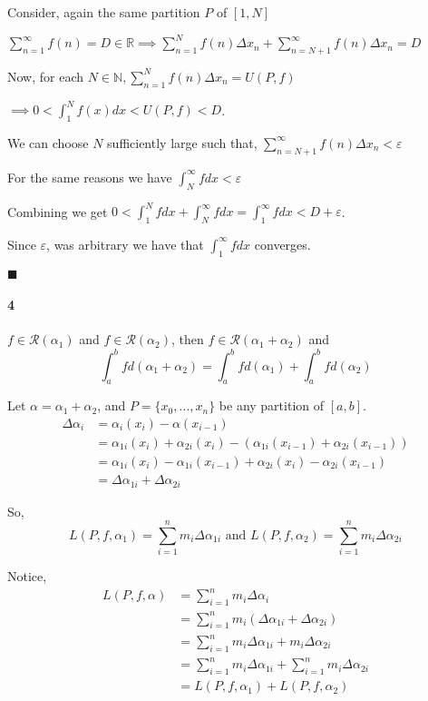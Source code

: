 \documentclass{article}
\newcommand\N{\mathbb{N}}
\newcommand\R{\mathbb{R}}
\begin{document}
Consider, again the same partition $P$ of $[1,N]$

$\sum_{n = 1}^\infty f(n) = D \in \R \implies \sum_{n=1}^{N}
f(n)\varDelta x_n + \sum_{n=N+1}^\infty f(n)\varDelta x_n = D$

Now, for each $N \in \N, \sum_{n=1}^N f(n)\varDelta x_n = U(P,f)$

$\implies 0 < \int_1^Nf(x) dx < U(P,f) < D$.

We can choose $N$ sufficiently large such that, $\sum_{n =
  N+1}^{\infty} f(n)\varDelta x_n <\varepsilon$

For the same reasons we have $\int_{N}^\infty f dx <\varepsilon$


Combining we get $0 < \int_1^N f dx+ \int_N^\infty fdx = \int_1^\infty
f dx < D+\varepsilon$.

Since $\varepsilon$, was arbitrary we have that $\int_1^\infty f dx$ converges.

$\blacksquare$


\paragraph{4} $f\in \mathscr{R} (\alpha_1)$ and
$f\in\mathscr{R}(\alpha_2)$, then
$f\in\mathscr{R}(\alpha_1+\alpha_2)$ and \[\int_a^b
  fd(\alpha_1+\alpha_2) = \int_a^b
  fd(\alpha_1) +\int_a^b
  fd(\alpha_2)  \]


Let $\alpha = \alpha_1 +\alpha_2$, and $P=\{x_0,\dots,x_n\}$ be any partition of
$[a,b].$
\begin{align*}
\varDelta\alpha_i &= \alpha_i(x_i)-\alpha(x_{i-1}) \\&=
\alpha_{1i}(x_i)+\alpha_{2i}(x_i)-(\alpha_{1i}(x_{i-1})+\alpha_{2i}(x_{i-1}))\\
&= \alpha_{1i}(x_i)-\alpha_{1i}(x_{i-1}) +
\alpha_{2i}(x_i)-\alpha_{2i}(x_{i-1})\\ &= \varDelta\alpha_{1i}+\varDelta\alpha_{2i}\end{align*}

So,
$$L(P,f,\alpha_1) = \sum_{i=1}^n m_i \varDelta\alpha_{1i}\text{ and }L(P,f,\alpha_2) = \sum_{i=1}^n m_i \varDelta\alpha_{2i}$$

Notice,
\begin{align*}
  L(P,f,\alpha) &= \sum_{i=1}^n m_i \varDelta\alpha_i \\
                &= \sum_{i=1}^n m_i (\varDelta\alpha_{1i} +
                  \varDelta\alpha_{2i})\\
                &= \sum_{i=1}^n m_i \varDelta\alpha_{1i} + m_i
                  \varDelta\alpha_{2i}\\
                &= \sum_{i=1}^n m_i \varDelta\alpha_{1i} +
                  \sum_{i=1}^n m_i
                  \varDelta\alpha_{2i}\\
                &= L(P,f,\alpha_1) + L(P,f,\alpha_2)
\end{align*}
\end{document}
